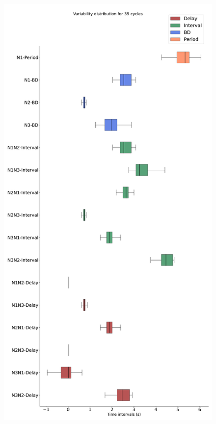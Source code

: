 \begin{figure}[htbp]
\begin{minipage}[b]{0.45\textwidth}
		\includegraphics[width=\textwidth]{./invariants/data/SUSSEX/CV1a_driven1/images/stim_cv1a1_3phases_boxplot.pdf}
	\end{minipage}
	\begin{minipage}[b]{0.53\textwidth}

\end{minipage}
\end{figure}
